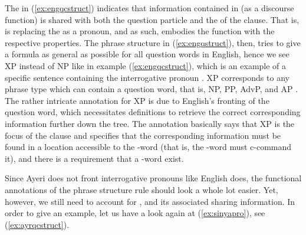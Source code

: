 The \Avm{} in (\ref{ex:engqcstruct}) indicates that information contained in
\Foc{} (as a discourse function) is shared with both the question particle \Q{}
and the \Obj{} of the clause. That is, \Q{} is replacing the \Obj{} as a
pronoun, and as such, embodies the \Foc{} function with the respective
properties. The phrase structure in (\ref{ex:engqstruct}), then, tries to give
a formula as general as possible for all question words in English, hence we
see XP instead of NP like in example (\ref{ex:engqcstruct}), which is an
example of a specific sentence containing the interrogative pronoun .
XP corresponds to any phrase type which can contain a question word, that is,
NP, PP, AdvP, and AP \citep[407] {dalrymple2001}. The rather intricate
annotation for XP is due to English's fronting of the question word, which
necessitates definitions to retrieve the correct corresponding information
further down the tree. The annotation basically says that XP is the focus of
the clause and specifies that the corresponding information must be found in a
location accessible to the -word (that is, the -word must
c-command it), and there is a requirement that a -word exist.

Since Ayeri does not front interrogative pronouns like English does, the
functional annotations of the phrase structure rule should look a whole lot
easier. Yet, however, we still need to account for \Q{}, \Foc{} and its
associated \GF{} sharing information. In order to give an example, let us have
a look again at (\ref{ex:sinyapro}), see (\ref{ex:ayrqcstruct}).

